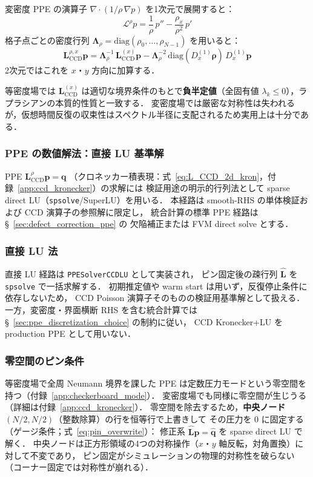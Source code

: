 変密度 PPE の演算子 $\nabla\cdot(1/\rho\,\nabla p)$ を1次元で展開すると：
\[
  \mathcal{L}^{\rho}p = \frac{1}{\rho}\,p'' - \frac{\rho_x}{\rho^2}\,p'
\]
格子点ごとの密度行列 $\boldsymbol{\Lambda}_\rho = \mathrm{diag}(\rho_0, \dots, \rho_{N-1})$ を用いると：
\begin{equation}
  \mathbf{L}_{\mathrm{CCD}}^{\rho,x}\bm{p}
  = \boldsymbol{\Lambda}_\rho^{-1}\,\mathbf{L}_{\mathrm{CCD}}^{(x)}\bm{p}
  - \boldsymbol{\Lambda}_\rho^{-2}\,\mathrm{diag}(D_x^{(1)}\bm{\rho})\,D_x^{(1)}\bm{p}
\end{equation}
2次元ではこれを $x$・$y$ 方向に加算する．

等密度場では $\mathbf{L}_{\mathrm{CCD}}^{(x)}$ は適切な境界条件のもとで\textbf{負半定値}（全固有値 $\lambda_k \le 0$），ラプラシアンの本質的性質と一致する．
変密度場では厳密な対称性は失われるが，仮想時間反復の収束性はスペクトル半径に支配されるため実用上は十分である．

\subsubsection{PPE の数値解法：直接 LU 基準解}
\label{app:ccd_lu_direct}

PPE $\mathbf{L}_{\mathrm{CCD}}^{\rho}\bm{p} = \bm{q}$
（クロネッカー積表現：式~\eqref{eq:L_CCD_2d_kron}，付録~\ref{app:ccd_kronecker}）の求解には
検証用途の明示的行列法として sparse direct LU（\texttt{spsolve}/SuperLU）を用いる．
本経路は smooth-RHS の単体検証および CCD 演算子の参照解に限定し，
統合計算の標準 PPE 経路は §~\ref{sec:defect_correction_ppe} の
欠陥補正または FVM direct solve とする．

\subsubsection*{直接 LU 法}

直接 LU 経路は \texttt{PPESolverCCDLU} として実装され，
ピン固定後の疎行列 $\hat{\mathbf{L}}$ を \texttt{spsolve} で一括求解する．
初期推定値や warm start は用いず，反復停止条件に依存しないため，
CCD Poisson 演算子そのものの検証用基準解として扱える．
一方，変密度・界面横断 RHS を含む統合計算では
§~\ref{sec:ppe_discretization_choice} の制約に従い，
CCD Kronecker+LU を production PPE として用いない．

\subsubsection*{零空間のピン条件}

等密度場で全周 Neumann 境界を課した PPE は定数圧力モードという零空間を持つ（付録~\ref{app:checkerboard_mode}）．
変密度場でも同様に零空間が生じうる（詳細は付録~\ref{app:ccd_kronecker}）．
零空間を除去するため，\textbf{中央ノード $(N/2, N/2)$}（整数除算）の行を恒等行で上書きして
その圧力を $0$ に固定する（ゲージ条件；式~\eqref{eq:pin_overwrite}）：
修正系 $\hat{\mathbf{L}}\bm{p} = \hat{\bm{q}}$ を sparse direct LU で解く．
中央ノードは正方形領域の4つの対称操作（$x$・$y$ 軸反転，対角置換）に対して不変であり，
ピン固定がシミュレーションの物理的対称性を破らない（コーナー固定では対称性が崩れる）．

